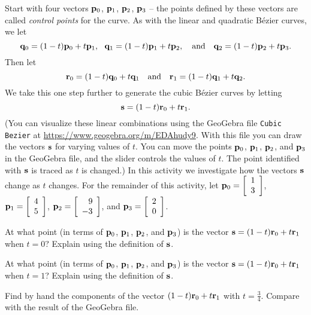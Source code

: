 \begin{pactivity} \label{act:1_d_cubic_Bezier} Start with four vectors $\mathbf{p}_0$, $\mathbf{p}_1$, $\mathbf{p}_2$, $\mathbf{p}_3$ -- the points defined by these vectors are called \emph{control points} for the curve. As with the linear and quadratic B\'{e}zier curves, we let 
\[\vq_0 = (1-t)\vp_0 + t\vp_1, \ \ \vq_1 = (1-t)\vp_1+t\vp_2,  \ \ \text{ and } \ \  \vq_2 = (1-t)\vp_2 + t\vp_3.\]
Then let 
\[\vr_0 = (1-t)\vq_0 + t\vq_1 \ \ \text{ and } \ \ \vr_1 = (1-t)\vq_1 + t\vq_2.\]
We take this one step further to generate the cubic B\'{e}zier curves by letting 
\[\mathbf{s} = (1-t)\mathbf{r}_0 + t\mathbf{r}_1.\]
(You can visualize these linear combinations using the GeoGebra file \texttt{Cubic} \texttt{ Bezier} at \url{https://www.geogebra.org/m/EDAhudy9}. With this file you can draw the vectors $\mathbf{s}$ for varying values of $t$. You can move the points $\mathbf{p}_0$, $\mathbf{p}_1$, $\mathbf{p}_2$, and $\mathbf{p}_3$ in the GeoGebra file, and the slider controls the values of $t$. The point identified with $\mathbf{s}$ is traced as $t$ is changed.)
In this activity we investigate how the vectors $\mathbf{s}$ change as $t$ changes. For the remainder of this activity, let $\mathbf{p}_0 = \left[ \begin{array}{c} 1 \\ 3 \end{array} \right]$, $\mathbf{p}_1 = \left[ \begin{array}{c} 4 \\ 5 \end{array} \right]$, $\mathbf{p}_2 = \left[ \begin{array}{r} 9 \\ -3 \end{array} \right]$, and $\mathbf{p}_3 = \left[ \begin{array}{c} 2 \\ 0 \end{array} \right]$.
	\ba
	\item At what point (in terms of $\mathbf{p}_0$, $\mathbf{p}_1$, $\mathbf{p}_2$, and $\mathbf{p}_3$) is the vector $\mathbf{s} = (1-t)\mathbf{r}_0 + t\mathbf{r}_1$ when $t=0$? Explain using the definition of $\mathbf{s}$. 

\item At what point (in terms of $\mathbf{p}_0$, $\mathbf{p}_1$, $\mathbf{p}_2$, and $\mathbf{p}_3$) is the vector $\mathbf{s} = (1-t)\mathbf{r}_0 + t\mathbf{r}_1$ when $t=1$? Explain using the definition of $\mathbf{s}$. 

\item Find by hand the components of the vector $(1-t)\mathbf{r}_0 + t\mathbf{r}_1$ with $t = \frac{3}{4}$. Compare with the result of the GeoGebra file. 

\ea

\end{pactivity}

